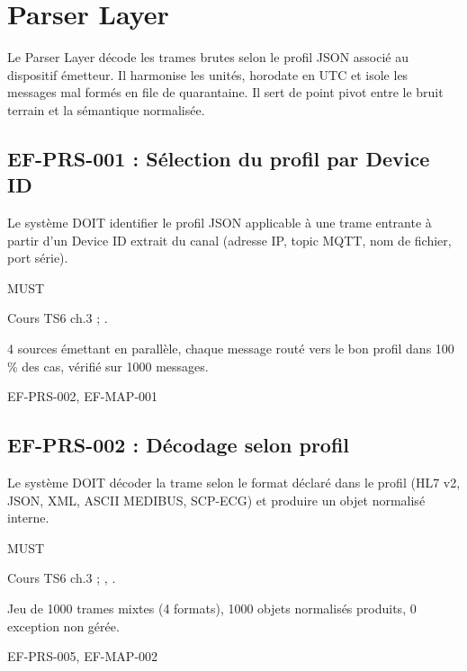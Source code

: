 \section{Parser Layer}
\label{sec:ef-parser}

Le Parser Layer décode les trames brutes selon le profil JSON associé au dispositif émetteur. Il harmonise les unités, horodate en UTC et isole les messages mal formés en file de quarantaine. Il sert de point pivot entre le bruit terrain et la sémantique normalisée.

\subsection*{EF-PRS-001 : Sélection du profil par Device ID}
\begin{description}[leftmargin=2.5cm, style=nextline]
  \item[Énoncé] Le système DOIT identifier le profil JSON applicable à une trame entrante à partir d'un Device ID extrait du canal (adresse IP, topic MQTT, nom de fichier, port série).
  \item[Priorité] MUST
  \item[Source] Cours TS6 ch.3 ; \cite{ihe_pcd_tf}.
  \item[Recette] 4 sources émettant en parallèle, chaque message routé vers le bon profil dans 100 \% des cas, vérifié sur 1000 messages.
  \item[Lié à] EF-PRS-002, EF-MAP-001
\end{description}

\subsection*{EF-PRS-002 : Décodage selon profil}
\begin{description}[leftmargin=2.5cm, style=nextline]
  \item[Énoncé] Le système DOIT décoder la trame selon le format déclaré dans le profil (HL7 v2, JSON, XML, ASCII MEDIBUS, SCP-ECG) et produire un objet normalisé interne.
  \item[Priorité] MUST
  \item[Source] Cours TS6 ch.3 ; \cite{hl7_fhir_r4}, \cite{draeger_medibus_protocol}.
  \item[Recette] Jeu de 1000 trames mixtes (4 formats), 1000 objets normalisés produits, 0 exception non gérée.
  \item[Lié à] EF-PRS-005, EF-MAP-002
\end{description}

